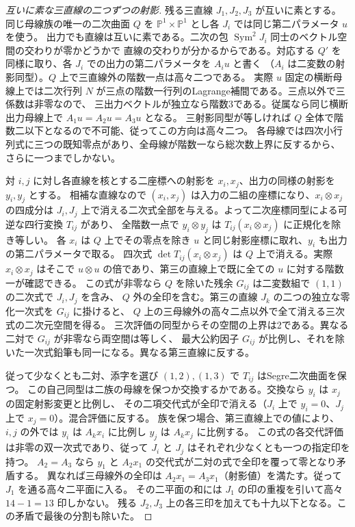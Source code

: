 \begin{proof}[互いに素な三直線の二つずつの射影]
残る三直線 $J_1,J_2,J_3$ が互いに素とする。同じ母線族の唯一の二次曲面 $Q$ を
$\mathbb P^1\times\mathbb P^1$ とし各 $J_i$ では同じ第二パラメータ $u$ を使う。
出力でも直線は互いに素である。二次の包 $\operatorname{Sym}^2 J_i$ 同士のベクトル空間の交わりが零かどうかで
直線の交わりが分かるからである。対応する $Q'$ を同様に取り、各 $J_i$ での出力の第二パラメータを $A_i u$ と書く
（$A_i$ は二変数の射影同型）。$Q$ 上で三直線外の階数一点は高々二つである。
実際 $u$ 固定の横断母線上では二次行列 $N$ が三点の階数一行列のLagrange補間である。三点以外で三係数は非零なので、
三出力ベクトルが独立なら階数3である。従属なら同じ横断出力母線上で $A_1u=A_2u=A_3u$ となる。
三射影同型が等しければ $Q$ 全体で階数二以下となるので不可能、従ってこの方向は高々二つ。
各母線では四次小行列式に三つの既知零点があり、全母線が階数一なら総次数上界に反するから、
さらに一つまでしかない。

対 $i,j$ に対し各直線を核とする二座標への射影を $x_i,x_j$、出力の同様の射影を $y_i,y_j$ とする。
相補な直線なので $(x_i,x_j)$ は入力の二組の座標になり、$x_i\otimes x_j$ の四成分は
$J_i,J_j$ 上で消える二次式全部を与える。よって二次座標同型による可逆な四行変換 $T_{ij}$ があり、
全階数一点で $y_i\otimes y_j$ は $T_{ij}(x_i\otimes x_j)$ に正規化を除き等しい。
各 $x_i$ は $Q$ 上でその零点を除き $u$ と同じ射影座標に取れ、$y_i$ も出力の第二パラメータで取る。
四次式 $\det T_{ij}(x_i\otimes x_j)$ は $Q$ 上で消える。実際 $x_i\otimes x_j$ はそこで
$u\otimes u$ の倍であり、第三の直線上で既に全ての $u$ に対する階数一が確認できる。
この式が非零なら $Q$ を除いた残余 $G_{ij}$ は二変数組で $(1,1)$ の二次式で $J_i,J_j$ を含み、
$Q$ 外の全印を含む。第三の直線 $J_k$ の二つの独立な零化一次式を $G_{ij}$ に掛けると、
$Q$ 上の三母線外の高々二点以外で全て消える三次式の二次元空間を得る。
三次評価の同型からその空間の上界は2である。異なる二対で $G_{ij}$ が非零なら両空間は等しく、
最大公約因子 $G_{ij}$ が比例し、それを除いた一次式鉛筆も同一になる。異なる第三直線に反する。

従って少なくとも二対、添字を選び $(1,2),(1,3)$ で $T_{ij}$ はSegre二次曲面を保つ。
この自己同型は二族の母線を保つか交換するかである。交換なら $y_i$ は $x_j$ の固定射影変更と比例し、
その二項交代式が全印で消える（$J_i$ 上で $y_i=0$、$J_j$ 上で $x_j=0$）。混合評価に反する。
族を保つ場合、第三直線上での値により、$i,j$ の外では $y_i$ は $A_k x_i$ に比例し $y_j$ は $A_k x_j$ に比例する。
この式の各交代評価は非零の双一次式であり、従って $J_i$ と $J_j$ はそれぞれ少なくとも一つの指定印を持つ。
$A_2=A_3$ なら $y_1$ と $A_2 x_1$ の交代式が二対の式で全印を覆って零となり矛盾する。
異なれば三母線外の全印は $A_2 x_1=A_3 x_1$（射影値）を満たす。従って $J_1$ を通る高々二平面に入る。
その二平面の和には $J_1$ の印の重複を引いて高々 $14-1=13$ 印しかない。
残る $J_2,J_3$ 上の各三印を加えても十九以下となる。この矛盾で最後の分割も除いた。
\end{proof}
